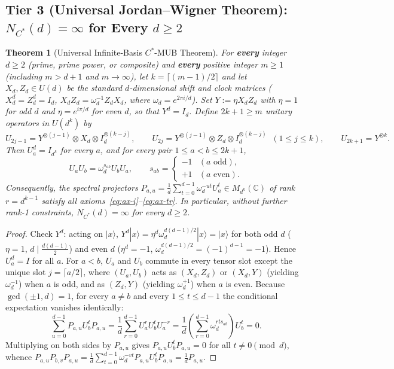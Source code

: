 \documentclass[11pt,a4paper]{article}
\newtheorem{theorem}{Theorem}[section]
\theoremstyle{definition}
\newcommand{\C}{\mathbb{C}}
\begin{document}
\subsection{Tier 3 (Universal Jordan--Wigner Theorem): $N_{C^*}(d) = \infty$ for Every $d \ge 2$}

\begin{theorem}[Universal Infinite-Basis $C^*$-MUB Theorem]
\label{thm:jw}
For \textbf{every} integer $d \ge 2$ (prime, prime power, or composite) and \textbf{every} positive integer $m \ge 1$ (including $m > d+1$ and $m \to \infty$), let $k = \lceil (m-1)/2 \rceil$ and let $X_d, Z_d \in U(d)$ be the standard $d$-dimensional shift and clock matrices ($X_d^d = Z_d^d = I_d$, $X_d Z_d = \omega_d^{-1} Z_d X_d$, where $\omega_d = e^{2\pi i / d}$). Set $Y := \eta X_d Z_d$ with $\eta = 1$ for odd $d$ and $\eta = e^{i\pi/d}$ for even $d$, so that $Y^d = I_d$. Define $2k + 1 \ge m$ unitary operators in $U(d^k)$ by
\[
  U_{2j-1} = Y^{\otimes(j-1)} \otimes X_d \otimes I_d^{\otimes(k-j)}, \qquad
  U_{2j} = Y^{\otimes(j-1)} \otimes Z_d \otimes I_d^{\otimes(k-j)} \;\; (1 \le j \le k), \qquad
  U_{2k+1} = Y^{\otimes k}.
\]
Then $U_a^d = I_{d^k}$ for every $a$, and for every pair $1 \le a < b \le 2k+1$,
\[
  U_a U_b = \omega_d^{s_{ab}} U_b U_a, \qquad s_{ab} = \begin{cases} -1 & (a \text{ odd}), \\ +1 & (a \text{ even}). \end{cases}
\]
Consequently, the spectral projectors $P_{a,u} = \frac{1}{d}\sum_{t=0}^{d-1} \omega_d^{-ut} U_a^t \in M_{d^k}(\C)$ of rank $r = d^{k-1}$ satisfy all axioms~\eqref{eq:ax-i}--\eqref{eq:ax-tr}. In particular, without further rank-1 constraints, $N_{C^*}(d) = \infty$ for every $d \ge 2$.
\end{theorem}

\begin{proof}
Check $Y^d$: acting on $|x\rangle$, $Y^d|x\rangle = \eta^d \omega_d^{d(d-1)/2} |x\rangle = |x\rangle$ for both odd $d$ ($\eta=1$, $d \mid \frac{d(d-1)}{2}$) and even $d$ ($\eta^d = -1$, $\omega_d^{d(d-1)/2} = (-1)^{d-1} = -1$). Hence $U_a^d = I$ for all $a$. For $a < b$, $U_a$ and $U_b$ commute in every tensor slot except the unique slot $j = \lceil a/2 \rceil$, where $(U_a, U_b)$ acts as $(X_d, Z_d)$ or $(X_d, Y)$ (yielding $\omega_d^{-1}$) when $a$ is odd, and as $(Z_d, Y)$ (yielding $\omega_d^{+1}$) when $a$ is even. Because $\gcd(\pm 1, d) = 1$, for every $a \ne b$ and every $1 \le t \le d-1$ the conditional expectation vanishes identically:
\[
  \sum_{u=0}^{d-1} P_{a,u} U_b^t P_{a,u} = \frac{1}{d}\sum_{r=0}^{d-1} U_a^r U_b^t U_a^{-r} = \frac{1}{d}\left(\sum_{r=0}^{d-1} \omega_d^{r t s_{ab}}\right) U_b^t = 0.
\]
Multiplying on both sides by $P_{a,u}$ gives $P_{a,u} U_b^t P_{a,u} = 0$ for all $t \ne 0 \pmod d$, whence $P_{a,u} P_{b,v} P_{a,u} = \frac{1}{d}\sum_{t=0}^{d-1} \omega_d^{-vt} P_{a,u} U_b^t P_{a,u} = \frac{1}{d} P_{a,u}$.
\end{proof}
\end{document}

